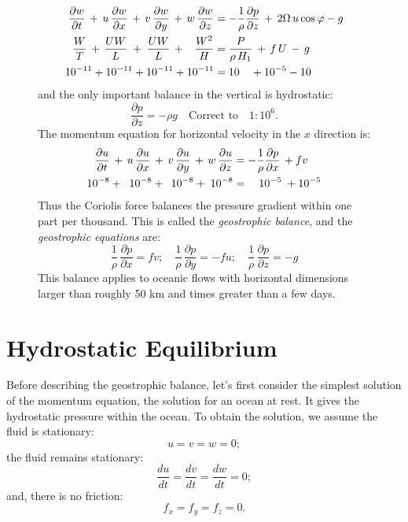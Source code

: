 \begin{figure} [t!]
{{\begin{minipage}{11.5cm}
\begin{align}
\frac{\partial w}{\partial t}\,+\,u\,\frac{\partial w}{\partial x}\,+\,v\,
\frac{\partial w}{\partial y}\,+\,w\,\frac{\partial w}{\partial z}&
=-\frac{1}{\rho}\frac{\partial p}{\partial z}\,+\,2\Omega \, u \cos\varphi -g
\notag\\ \notag
\frac{W}{T}\,+\,\frac{UW}{L}\;+\;\frac{UW}{L}\,+\;\;\;\frac{W^2}{H}&=\frac{P}{\rho\,H_1}\,+\,f\,U\,-\,g
\notag\\ \notag 10^{-11} + 10^{-11} + 10^{-11} + 10^{-11} & =10\quad + 10^{-5} - 10
\notag
\end{align}
and the only important balance in the vertical is hydrostatic:
\begin{displaymath}
\frac{\partial p}{\partial z}=-\rho g \quad \text{Correct to}\quad 1:10^6.
\end{displaymath}
The momentum equation for horizontal velocity in the $x$ direction is:
\begin{align}
\frac{\partial u}{\partial t}\,+\,u\,\frac{\partial u}{\partial
x}\,+\,v\,\frac{\partial u}{\partial y}\,+\,w\,\frac{\partial u} {\partial z} &
=-\frac{1}{\rho}\frac{\partial p}{\partial x}\,+fv \notag\\ \notag 10^{-8} +\;\;
10^{-8} + \:\;10^{-8} + \;10^{-8} & =\quad 10^{-5}\; + 10^{-5}
\notag
\end{align}
Thus the Coriolis force  balances the pressure gradient within one part per thousand. This is called the \textit{geostrophic balance}, and the \textit{geostrophic equations} are:
\begin{displaymath}
\frac{1}{\rho}\,\frac{\partial p}{\partial x}  =f v; \quad
\frac{1}{\rho}\,\frac{\partial p}{\partial y}  =-f u; \quad
\frac{1}{\rho}\,\frac{\partial p}{\partial z}  = -g
\end{displaymath} \notag
This balance applies to oceanic flows with horizontal dimensions larger than
roughly 50 km and times greater than a few days.
\vspace{0.7ex}
\end{minipage}}}
\vspace{-5ex}
\end{figure}


\section{Hydrostatic Equilibrium}
Before describing the geostrophic balance, let's first
consider the simplest solution of the momentum equation, the solution for an ocean at
rest. It gives the hydrostatic pressure within the ocean. To obtain the solution, we
assume the fluid is stationary:
\begin{equation}
 u=v=w=0;
\end{equation}
the fluid remains stationary:
\begin{equation}
\frac{du}{dt}=\frac{dv}{dt}=\frac{dw}{dt} = 0;
\end{equation}
and, there is no friction:
\begin{equation}
f_x=f_y=f_z=0.
\end{equation}

